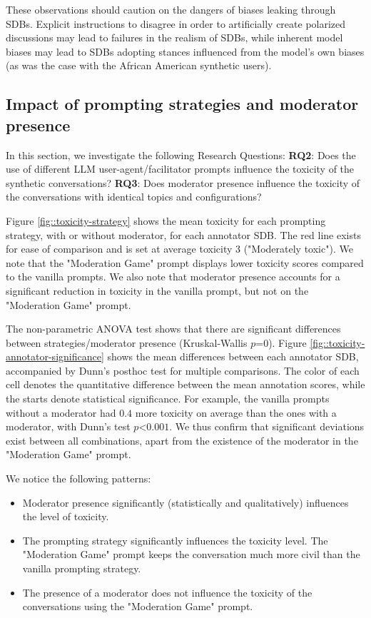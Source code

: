 These observations should caution on the dangers of biases leaking through \acp{SDB}. Explicit instructions to disagree in order to artificially create polarized discussions may lead to failures in the realism of \acp{SDB}, while inherent model biases may lead to \acp{SDB} adopting stances influenced from the model's own biases (as was the case with the African American synthetic users).


\subsection{Impact of prompting strategies and moderator presence}
\label{ssec:evaluation:prompts}

In this section, we investigate the following Research Questions: \textbf{RQ2}: Does the use of different LLM user-agent/facilitator prompts influence the toxicity of the synthetic conversations? \textbf{RQ3}: Does moderator presence influence the toxicity of the conversations with identical topics and configurations?

Figure \ref{fig::toxicity-strategy} shows the mean toxicity for each prompting strategy, with or without moderator, for each annotator \ac{SDB}. The red line exists for ease of comparison and is set at average toxicity 3 ("Moderately toxic"). We note that the "Moderation Game" prompt displays lower toxicity scores compared to the vanilla prompts. We also note that moderator presence accounts for a significant reduction in toxicity in the vanilla prompt, but not on the "Moderation Game" prompt. 

The non-parametric ANOVA test shows that there are significant differences between strategies/moderator presence (Kruskal-Wallis $p\text{=}0$). Figure \ref{fig::toxicity-annotator-significance} shows the mean differences between each annotator \ac{SDB}, accompanied by Dunn's posthoc test for multiple comparisons. The color of each cell denotes the quantitative difference between the mean annotation scores, while the starts denote statistical significance. For example, the vanilla prompts without a moderator had $0.4$ more toxicity on average than the ones with a moderator, with Dunn's test $p\text{<}0.001$. We thus confirm that significant deviations exist between all combinations, apart from the existence of the moderator in the "Moderation Game" prompt.

We notice the following patterns:

\begin{itemize}
	\item Moderator presence significantly (statistically and qualitatively) influences the level of toxicity.
	
	\item The prompting strategy significantly influences the toxicity level. The "Moderation Game" prompt keeps the conversation much more civil than the vanilla prompting strategy.
	
	\item The presence of a moderator does not influence the toxicity of the conversations using the "Moderation Game" prompt.
\end{itemize}

